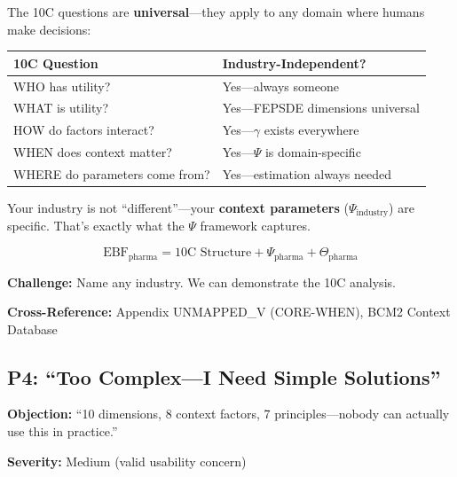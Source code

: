 \begin{axiom}
The 10C questions are \textbf{universal}---they apply to any domain where
humans make decisions:

\begin{center}
\begin{tabular}{ll}
\textbf{10C Question} & \textbf{Industry-Independent?} \\
\midrule
WHO has utility? & Yes---always someone \\
WHAT is utility? & Yes---FEPSDE dimensions universal \\
HOW do factors interact? & Yes---$\gamma$ exists everywhere \\
WHEN does context matter? & Yes---$\Psi$ is domain-specific \\
WHERE do parameters come from? & Yes---estimation always needed \\
\end{tabular}
\end{center}

Your industry is not ``different''---your \textbf{context parameters} ($\Psi_{\text{industry}}$)
are specific. That's exactly what the $\Psi$ framework captures.

\begin{equation}
\text{EBF}_{\text{pharma}} = \text{10C Structure} + \Psi_{\text{pharma}} + \Theta_{\text{pharma}}
\end{equation}
\end{axiom}

\textbf{Challenge:} Name any industry. We can demonstrate the 10C analysis.

\textbf{Cross-Reference:} Appendix UNMAPPED_V (CORE-WHEN), BCM2 Context Database

\subsection{P4: ``Too Complex---I Need Simple Solutions''}
\label{sec:da-p4}

\begin{tcolorbox}[colback=gray!5!white, colframe=gray!75!black]
\textbf{Objection:} ``10 dimensions, 8 context factors, 7 principles---nobody
can actually use this in practice.''

\textbf{Severity:} Medium (valid usability concern)
\end{tcolorbox}

